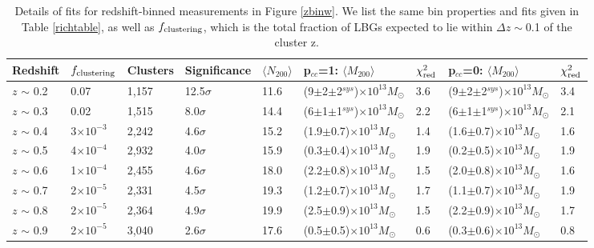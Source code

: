 \begin{landscape}
\begin{table}
  \centering
    \caption[Magnification Results for Redshift-Binned Clusters]{Details of fits for redshift-binned measurements in Figure \ref{zbinw}. We list the same bin properties and fits given in Table \ref{richtable}, as well as $f_{\rm clustering}$, which is the total fraction of \ac{LBG}s expected to lie within $\Delta z \sim$0.1 of the cluster z.}
    \label{ztable}
    \begin{tabular}{lllllllll}
      \hline
      Redshift & $f_{\rm clustering}$ & Clusters & Significance & $\langle N_{200} \rangle$ & p$_{cc}$=1: $\langle M_{200} \rangle$ & $\chi^2_{\rm red}$  & p$_{cc}$=0: $\langle M_{200} \rangle$ & $\chi^2_{\rm red}$ \\ \hline
      $z$ $\sim$ 0.2 & 0.07 & 1,157 & 12.5$\sigma$ & 11.6 & (9$\pm$2$\pm$2$^{sys}$)$\times10^{13} M_{\odot}$ & 3.6 & (9$\pm$2$\pm$2$^{sys}$)$\times10^{13} M_{\odot}$ & 3.4  \\
      $z$ $\sim$ 0.3 & 0.02 & 1,515 & 8.0$\sigma$ & 14.4 & (6$\pm$1$\pm$1$^{sys}$)$\times10^{13} M_{\odot}$ & 2.2 & (6$\pm$1$\pm$1$^{sys}$)$\times10^{13} M_{\odot}$ & 2.1  \\
      $z$ $\sim$ 0.4 & 3$\times10^{-3}$ & 2,242 & 4.6$\sigma$ & 15.2 & (1.9$\pm$0.7)$\times10^{13} M_{\odot}$ & 1.4 & (1.6$\pm$0.7)$\times10^{13} M_{\odot}$ & 1.6  \\
      $z$ $\sim$ 0.5 & 4$\times10^{-4}$ & 2,932 & 4.0$\sigma$ & 15.9 & (0.3$\pm$0.4)$\times10^{13} M_{\odot}$ & 1.9 & (0.2$\pm$0.5)$\times10^{13} M_{\odot}$ & 1.9  \\
      $z$ $\sim$ 0.6 & 1$\times10^{-4}$ & 2,455 & 4.6$\sigma$ & 18.0 & (2.2$\pm$0.8)$\times10^{13} M_{\odot}$ & 1.5 & (2.0$\pm$0.8)$\times10^{13} M_{\odot}$ & 1.6  \\
      $z$ $\sim$ 0.7 & 2$\times10^{-5}$ & 2,331 & 4.5$\sigma$ & 19.3 & (1.2$\pm$0.7)$\times10^{13} M_{\odot}$ & 1.7 & (1.1$\pm$0.7)$\times10^{13} M_{\odot}$ & 1.9  \\
      $z$ $\sim$ 0.8 & 2$\times10^{-5}$ & 2,364 & 4.9$\sigma$ & 19.9 & (2.5$\pm$0.9)$\times10^{13} M_{\odot}$ & 1.5 & (2.2$\pm$0.9)$\times10^{13} M_{\odot}$ & 1.7  \\ 
      $z$ $\sim$ 0.9 & 2$\times10^{-5}$ & 3,040 & 2.6$\sigma$ & 17.6 & (0.5$\pm$0.5)$\times10^{13} M_{\odot}$ & 0.6 & (0.3$\pm$0.6)$\times10^{13} M_{\odot}$ & 0.8  \\
      \hline
    \end{tabular}
\end{table}
\end{landscape}


